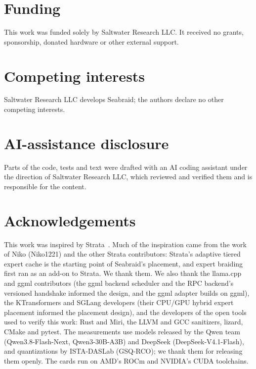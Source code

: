\documentclass[11pt]{article}
\newcommand{\product}{Seabraid}                 %
\begin{document}
\section*{Funding}
This work was funded solely by Saltwater Research LLC. It received no grants, sponsorship, donated hardware or other external support.

\section*{Competing interests}
Saltwater Research LLC develops \product; the authors declare no other competing interests.

\section*{AI-assistance disclosure}
Parts of the code, tests and text were drafted with an AI coding assistant under the direction of Saltwater Research LLC,
which reviewed and verified them and is responsible for the content.

\section*{Acknowledgements}
This work was inspired by Strata~\cite{strata}. Much of the inspiration came from the work of Niko (Niko1221) and the
other Strata contributors: Strata's adaptive tiered expert cache is the starting point of \product's
placement, and expert braiding first ran as an add-on to Strata. We thank them. We also thank the llama.cpp and ggml
contributors (the ggml backend scheduler and the RPC backend's versioned handshake informed the design, and the ggml
adapter builds on ggml), the KTransformers and SGLang developers (their CPU/GPU hybrid expert placement informed the
placement design), and the developers of the open tools used to verify this work: Rust and Miri, the LLVM and GCC
sanitizers, lizard, CMake and pytest. The measurements use models released by the Qwen team (Qwen3.8-Flash-Next,
Qwen3-30B-A3B) and DeepSeek (DeepSeek-V4.1-Flash), and quantizations by ISTA-DASLab (GSQ-RCO); we thank them for
releasing them openly. The cards run on AMD's ROCm and NVIDIA's CUDA toolchains.



\end{document}
